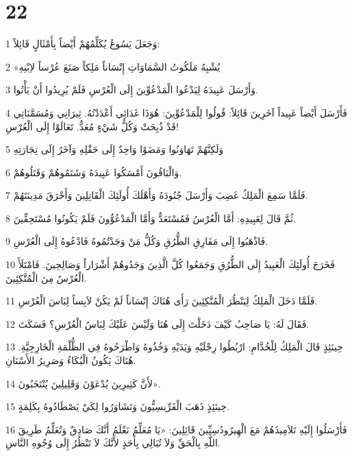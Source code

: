 \chapter{22}

\par 1 وَجَعَلَ يَسُوعُ يُكَلِّمُهُمْ أَيْضاً بِأَمْثَالٍ قَائِلاً:
\par 2 «يُشْبِهُ مَلَكُوتُ السَّمَاوَاتِ إِنْسَاناً مَلِكاً صَنَعَ عُرْساً لاِبْنِهِ
\par 3 وَأَرْسَلَ عَبِيدَهُ لِيَدْعُوا الْمَدْعُوِّينَ إِلَى الْعُرْسِ فَلَمْ يُرِيدُوا أَنْ يَأْتُوا.
\par 4 فَأَرْسَلَ أَيْضاً عَبِيداً آخَرِينَ قَائِلاً: قُولُوا لِلْمَدْعُوِّينَ: هُوَذَا غَدَائِي أَعْدَدْتُهُ. ثِيرَانِي وَمُسَمَّنَاتِي قَدْ ذُبِحَتْ وَكُلُّ شَيْءٍ مُعَدٌّ. تَعَالَوْا إِلَى الْعُرْسِ!
\par 5 وَلَكِنَّهُمْ تَهَاوَنُوا وَمَضَوْا وَاحِدٌ إِلَى حَقْلِهِ وَآخَرُ إِلَى تِجَارَتِهِ
\par 6 وَالْبَاقُونَ أَمْسَكُوا عَبِيدَهُ وَشَتَمُوهُمْ وَقَتَلُوهُمْ.
\par 7 فَلَمَّا سَمِعَ الْمَلِكُ غَضِبَ وَأَرْسَلَ جُنُودَهُ وَأَهْلَكَ أُولَئِكَ الْقَاتِلِينَ وَأَحْرَقَ مَدِينَتَهُمْ.
\par 8 ثُمَّ قَالَ لِعَبِيدِهِ: أَمَّا الْعُرْسُ فَمُسْتَعَدٌّ وَأَمَّا الْمَدْعُوُّونَ فَلَمْ يَكُونُوا مُسْتَحِقِّينَ.
\par 9 فَاذْهَبُوا إِلَى مَفَارِقِ الطُّرُقِ وَكُلُّ مَنْ وَجَدْتُمُوهُ فَادْعُوهُ إِلَى الْعُرْسِ.
\par 10 فَخَرَجَ أُولَئِكَ الْعَبِيدُ إِلَى الطُّرُقِ وَجَمَعُوا كُلَّ الَّذِينَ وَجَدُوهُمْ أَشْرَاراً وَصَالِحِينَ. فَامْتَلَأَ الْعُرْسُ مِنَ الْمُتَّكِئِينَ.
\par 11 فَلَمَّا دَخَلَ الْمَلِكُ لِيَنْظُرَ الْمُتَّكِئِينَ رَأَى هُنَاكَ إِنْسَاناً لَمْ يَكُنْ لاَبِساً لِبَاسَ الْعُرْسِ.
\par 12 فَقَالَ لَهُ: يَا صَاحِبُ كَيْفَ دَخَلْتَ إِلَى هُنَا وَلَيْسَ عَلَيْكَ لِبَاسُ الْعُرْسِ؟ فَسَكَتَ.
\par 13 حِينَئِذٍ قَالَ الْمَلِكُ لِلْخُدَّامِ: ارْبُطُوا رِجْلَيْهِ وَيَدَيْهِ وَخُذُوهُ وَاطْرَحُوهُ فِي الظُّلْمَةِ الْخَارِجِيَّةِ. هُنَاكَ يَكُونُ الْبُكَاءُ وَصَرِيرُ الأَسْنَانِ.
\par 14 لأَنَّ كَثِيرِينَ يُدْعَوْنَ وَقَلِيلِينَ يُنْتَخَبُونَ».
\par 15 حِينَئِذٍ ذَهَبَ الْفَرِّيسِيُّونَ وَتَشَاوَرُوا لِكَيْ يَصْطَادُوهُ بِكَلِمَةٍ.
\par 16 فَأَرْسَلُوا إِلَيْهِ تَلاَمِيذَهُمْ مَعَ الْهِيرُودُسِيِّينَ قَائِلِينَ: «يَا مُعَلِّمُ نَعْلَمُ أَنَّكَ صَادِقٌ وَتُعَلِّمُ طَرِيقَ اللَّهِ بِالْحَقِّ وَلاَ تُبَالِي بِأَحَدٍ لأَنَّكَ لاَ تَنْظُرُ إِلَى وُجُوهِ النَّاسِ.
